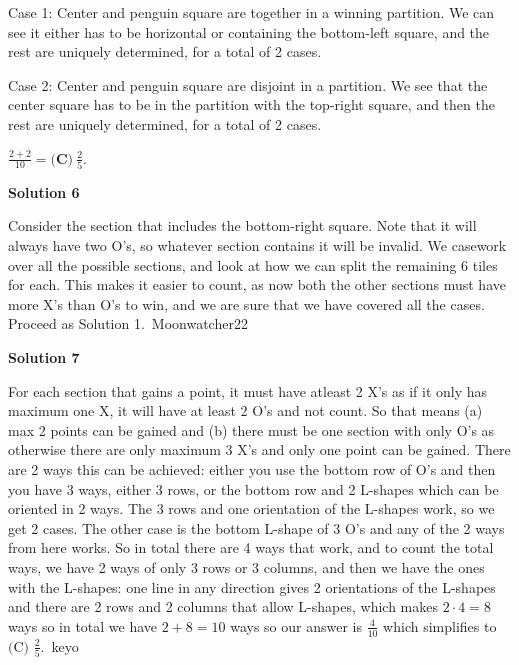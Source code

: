 \begin{enumerate}
 Case 1: Center and penguin square are together in a winning partition. We can see it either has to be horizontal or containing the bottom-left square, and the rest are uniquely determined, for a total of 2 cases.

 Case 2: Center and penguin square are disjoint in a partition. We see that the center square has to be in the partition with the top-right square, and then the rest are uniquely determined, for a total of 2 cases.

 $\frac{2+2}{10} = \boxed{\textbf{(C)}~\frac{2}{5}}$.

 



\textbf{Solution 6}

Consider the section that includes the bottom-right square. Note that it will always have two O's, so whatever section contains it will be invalid. We casework over all the possible sections, and look at how we can split the remaining 6 tiles for each. This makes it easier to count, as now both the other sections must have more X's than O's to win, and we are sure that we have covered all the cases. Proceed as Solution 1.~Moonwatcher22

 



\textbf{Solution 7}

For each section that gains a point, it must have atleast 2 X's as if it only has maximum one X, it will have at least 2 O's and not count. So that means (a) max 2 points can be gained and (b) there must be one section with only O's as otherwise there are only maximum 3 X's and only one point can be gained. There are 2 ways this can be achieved: either you use the bottom row of O's and then you have 3 ways, either 3 rows, or the bottom row and 2 L-shapes which can be oriented in 2 ways. The 3 rows and one orientation of the L-shapes work, so we get 2 cases. The other case is the bottom L-shape of 3 O's and any of the 2 ways from here works. So in total there are 4 ways that work, and to count the total ways, we have 2 ways of only 3 rows or 3 columns, and then we have the ones with the L-shapes: one line in any direction gives 2 orientations of the L-shapes and there are 2 rows and 2 columns that allow L-shapes, which makes $2\cdot4=8$ ways so in total we have $2+8=10$ ways so our answer is $\frac{4}{10}$ which simplifies to $\boxed{\text{(C) }\frac{2}{5}}$.~keyo

 


 



\end{enumerate}
